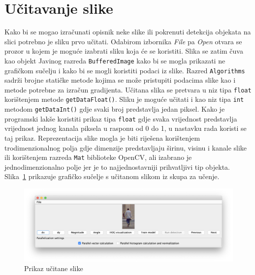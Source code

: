 \documentclass[times, utf8, zavrsni]{fer}
\begin{document}
\section{Učitavanje slike}
Kako bi se mogao izračunati opisnik neke slike ili pokrenuti detekcija objekata na slici potrebno je sliku prvo učitati. Odabirom izbornika \textit{File} pa \textit{Open} otvara se prozor u kojem je moguće izabrati sliku koja će se koristiti. Slika se zatim čuva kao objekt Javinog razreda \verb|BufferedImage| kako bi se mogla prikazati ne grafičkom sučelju i kako bi se mogli koristiti podaci iz slike. Razred \verb|Algorithms| sadrži brojne statičke metode kojima se može pristupiti podacima slike kao i metode potrebne za izračun gradijenta. Učitana slika se pretvara u niz tipa \verb|float| korištenjem metode \verb|getDataFloat()|. Sliku je moguće učitati i kao niz tipa \verb|int| metodom \verb|getDataInt()| gdje svaki broj predstavlja jedan piksel. Kako je programski lakše koristiti prikaz tipa \verb|float| gdje svaka vrijednost predstavlja vrijednost jednog kanala piksela u rasponu od 0 do 1, u nastavku rada koristi se taj prikaz. Reprezentacija slike mogla je biti riješena korištenjem trodimenzionalnog polja gdje dimenzije predstavljaju širinu, visinu i kanale slike ili korištenjem razreda \verb|Mat| biblioteke OpenCV, ali izabrano je jednodimenzionalno polje jer je to najjednostavniji prihvatljivi tip objekta. Slika~\ref{fig:loadedImage} prikazuje grafičko sučelje s učitanom slikom iz skupa za učenje.

\begin{figure}[htb]
	\centering
	\includegraphics[width=\linewidth]{figures/loadedImage.png}
	\caption{Prikaz učitane slike}
	\label{fig:loadedImage}
\end{figure}
\end{document}
